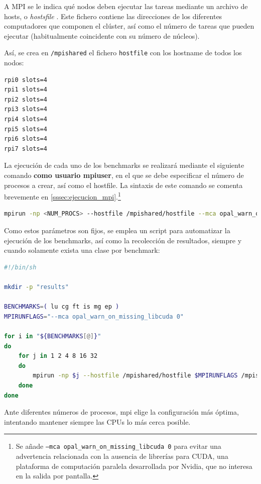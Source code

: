 A MPI se le indica qué nodos deben ejecutar las tareas mediante un archivo de hosts, o \textit{hostsfile} \cite{mpi_hostfile_option}. Este fichero contiene las direcciones de los diferentes computadores que componen el clúster, así como el número de tareas que pueden ejecutar (habitualmente coincidente con su número de núcleos).

Así, se crea en \texttt{/mpishared} el fichero \texttt{hostfile} con los hostname de todos los nodos:

\begin{lstlisting}[language=bash]
rpi0 slots=4
rpi1 slots=4
rpi2 slots=4
rpi3 slots=4
rpi4 slots=4
rpi5 slots=4
rpi6 slots=4
rpi7 slots=4
\end{lstlisting}

La ejecución de cada uno de los benchmarks se realizará mediante el siguiente comando \textbf{como usuario mpiuser}, en el que se debe especificar el número de procesos a crear, así como el hostfile. La sintaxis de este comando se comenta brevemente en \ref{sssec:ejecucion_mpi}.\footnote{Se añade \texttt{--mca opal\_warn\_on\_missing\_libcuda 0} para evitar una advertencia relacionada con la ausencia de librerías para CUDA, una plataforma de computación paralela desarrollada por Nvidia, que no interesa en la salida por pantalla.}

\begin{lstlisting}[language=bash]
mpirun -np <NUM_PROCS> --hostfile /mpishared/hostfile --mca opal_warn_on_missing_libcuda 0 /mpishared/NPB3.4.2/NPB3.4-MPI/bin/<KERNEL>.<CLASS>.x
\end{lstlisting}

Como estos parámetros son fijos, se emplea un script para automatizar la ejecución de los benchmarks, así como la recolección de resultados, siempre y cuando solamente exista una clase por benchmark:

\begin{lstlisting}[language=bash]
#!/bin/sh

mkdir -p "results"

BENCHMARKS=( lu cg ft is mg ep )
MPIRUNFLAGS="--mca opal_warn_on_missing_libcuda 0"

for i in "${BENCHMARKS[@]}"
do
    for j in 1 2 4 8 16 32
    do
        mpirun -np $j --hostfile /mpishared/hostfile $MPIRUNFLAGS /mpishared/NPB3.4.2/NPB3.4-MPI/bin/${i}.*.x | tee -a results/$i.$j.run
    done
done
\end{lstlisting}

Ante diferentes números de procesos, \acrshort{mpi} elige la configuración más óptima, intentando mantener siempre las CPUs lo más cerca posible.

